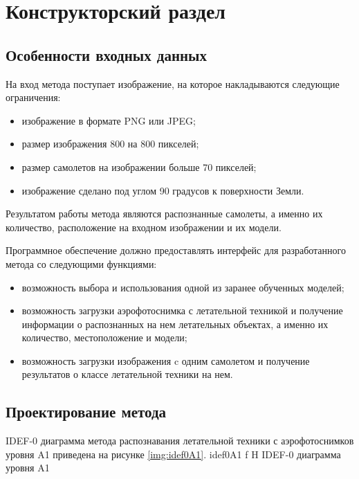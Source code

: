 \chapter{Конструкторский раздел}

\section{Особенности входных данных}
На вход метода поступает изображение, на которое накладываются следующие ограничения:
\begin{itemize}
	\item изображение в формате PNG или JPEG;
	\item размер изображения 800 на 800 пикселей;
	\item размер самолетов на изображении больше 70 пикселей;
	\item изображение сделано под углом 90 градусов к поверхности Земли.
\end{itemize}

Результатом работы метода являются распознанные самолеты, а именно их количество, расположение на входном изображении и их модели.

Программное обеспечение должно предоставлять интерфейс для разработанного метода со следующими функциями:
\begin{itemize}
	\item возможность выбора и использования одной из заранее обученных моделей;
	\item возможность загрузки аэрофотоснимка с летательной техникой и получение информации о распознанных на нем летательных объектах, а именно их количество, местоположение и модели;
	\item возможность загрузки изображения c одним самолетом и получение результатов о классе летательной техники на нем.
\end{itemize}


\section{Проектирование метода}
IDEF-0 диаграмма метода распознавания летательной техники с аэрофотоснимков уровня A1 приведена на рисунке \ref{img:idef0A1}.
{idef0A1} %
{f} %
{H} %
{\textwidth} %
{IDEF-0 диаграмма уровня A1} %

